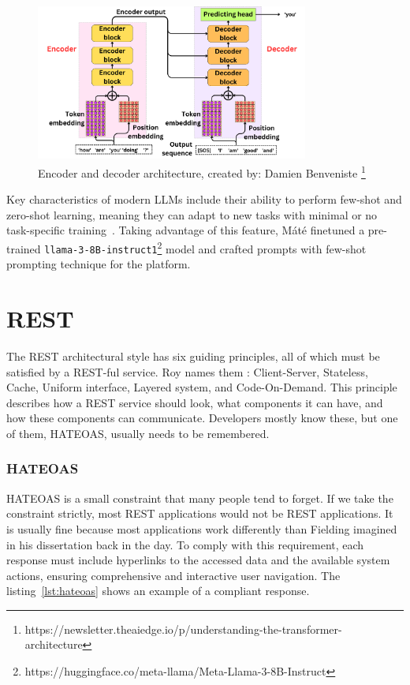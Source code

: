 \begin{figure}[H]
  \centering
  \includegraphics[width=0.8\textwidth, keepaspectratio]{figures/encoder-and-decoder.png}
  \caption{Encoder and decoder architecture, created by: Damien Benveniste \footnote{https://newsletter.theaiedge.io/p/understanding-the-transformer-architecture}}
  \label{fig:encoder-and-decoder}
\end{figure}

Key characteristics of modern LLMs include their ability to perform few-shot and zero-shot learning, meaning they can adapt to new tasks with minimal or no task-specific training~\cite{brown2020language}. Taking advantage of this feature, Máté finetuned a pre-trained \texttt{llama-3-8B-instruct1}\footnote{https://huggingface.co/meta-llama/Meta-Llama-3-8B-Instruct} model and crafted prompts with few-shot prompting technique for the platform.

\section{REST}

The REST architectural style has six guiding principles, all of which must be satisfied by a REST-ful service. Roy names them \cite[Chapter 5]{fielding2000}: Client-Server, Stateless, Cache, Uniform interface, Layered system, and Code-On-Demand. This principle describes how a REST service should look, what components it can have, and how these components can communicate. Developers mostly know these, but one of them, HATEOAS, usually needs to be remembered.

\subsubsection{HATEOAS}

HATEOAS is a small constraint that many people tend to forget. If we take the constraint strictly, most REST applications would not be REST applications. It is usually fine because most applications work differently than Fielding imagined in his dissertation back in the day. To comply with this requirement, each response must include hyperlinks to the accessed data and the available system actions, ensuring comprehensive and interactive user navigation. The listing~\ref{lst:hateoas} shows an example of a compliant response.

